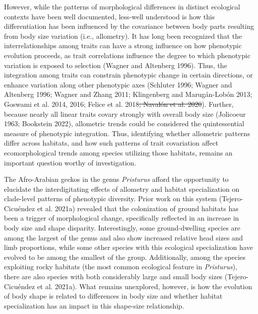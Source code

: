 \documentclass[
  11pt,
]{article}
\providecommand{\DIFdeltex}[1]{{\protect\color{red}\sout{#1}}}                      %
\providecommand{\DIFdelbegin}{} %
\providecommand{\DIFdelend}{} %
\providecommand{\DIFdel}[1]{\texorpdfstring{\DIFdeltex{#1}}{}} %
\newcommand{\DIFscaledelfig}{0.5}
\newlength{\DIFdelgraphicswidth} %
\newlength{\DIFdelgraphicsheight} %
\newcommand{\DIFdelincludegraphics}[2][]{%
\sbox{\DIFdelgraphicsbox}{\DIFOincludegraphics[#1]{#2}}%
\settoboxwidth{\DIFdelgraphicswidth}{\DIFdelgraphicsbox} %
\settoboxtotalheight{\DIFdelgraphicsheight}{\DIFdelgraphicsbox} %
\scalebox{\DIFscaledelfig}{%
\parbox[b]{\DIFdelgraphicswidth}{\usebox{\DIFdelgraphicsbox}\\[-\baselineskip] \rule{\DIFdelgraphicswidth}{0em}}\llap{\resizebox{\DIFdelgraphicswidth}{\DIFdelgraphicsheight}{%
\setlength{\unitlength}{\DIFdelgraphicswidth}%
\begin{picture}(1,1)%
\thicklines\linethickness{2pt} %
{\color[rgb]{1,0,0}\put(0,0){\framebox(1,1){}}}%
{\color[rgb]{1,0,0}\put(0,0){\line( 1,1){1}}}%
{\color[rgb]{1,0,0}\put(0,1){\line(1,-1){1}}}%
\end{picture}%
}\hspace*{3pt}}} %
} %
\DeclareRobustCommand{\DIFdelbegin}{\DIFOdelbegin \let\includegraphics\DIFdelincludegraphics} %
\DeclareRobustCommand{\DIFdelend}{\DIFOaddend \let\includegraphics\DIFOincludegraphics} %
\begin{document}
However, while the patterns of morphological differences in distinct
ecological contexts have been well documented, less-well understood is
how this differentiation has been influenced by the covariance between
body parts resulting from body size variation (i.e., allometry). It has
long been recognized that the interrelationships among traits can have a
strong influence on how phenotypic evolution proceeds, as trait
correlations influence the degree to which phenotypic variation is
exposed to selection (Wagner and Altenberg 1996). Thus, the integration
among traits can constrain phenotypic change in certain directions, or
enhance variation along other phenotypic axes (Schluter 1996; Wagner and
Altenberg 1996; Wagner and Zhang 2011; Klingenberg and Marugán-Lobón
2013; Goswami et al. 2014, 2016; Felice et al. 2018\DIFdelbegin \DIFdel{; Navalón et al.
2020}\DIFdelend ). Further, because
nearly all linear traits covary strongly with overall body size
(Jolicoeur 1963; Bookstein 2022), allometric trends could be considered
the quintessential measure of phenotypic integration. Thus, identifying
whether allometric patterns differ across habitats, and how such
patterns of trait covariation affect ecomorphological trends among
species utilizing those habitats, remains an important question worthy
of investigation. \hfill\break

The Afro-Arabian geckos in the genus \emph{Pristurus} afford the
opportunity to elucidate the interdigitating effects of allometry and
habitat specialization on clade-level patterns of phenotypic diversity.
Prior work on this system (Tejero-Cicuéndez et al. 2021a) revealed that
the colonization of ground habitats has been a trigger of morphological
change, specifically reflected in an increase in body size and shape
disparity. Interestingly, some ground-dwelling species are among the
largest of the genus and also show increased relative head sizes and
limb proportions, while some other species with this ecological
specialization have evolved to be among the smallest of the group.
Additionally, among the species exploiting rocky habitats (the most
common ecological feature in \emph{Pristurus}), there are also species
with both considerably large and small body sizes (Tejero-Cicuéndez et
al. 2021a). What remains unexplored, however, is how the evolution of
body shape is related to differences in body size and whether habitat
specialization has an impact in this shape-size relationship.
\hfill\break
\end{document}
